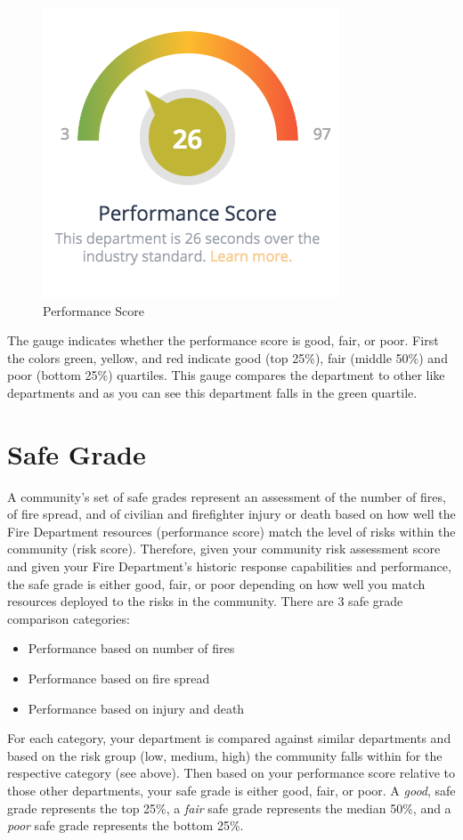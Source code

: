 \documentclass[12pt,oneside]{book}
\begin{document}
\begin{figure}[ht!]
\centering
\includegraphics[width=.5\columnwidth]{Figures/performance_score}
\caption{Performance Score}
\label{fig:perform}
\end{figure}

The gauge indicates whether the performance score is good, fair, or poor. First the colors green, yellow, and red indicate good (top 25\%), fair (middle 50\%) and poor (bottom 25\%) quartiles. This gauge compares the department to other like departments and as you can see this department falls in the green quartile. 

\FloatBarrier

\section{Safe Grade}

A community's set of safe grades represent an assessment of the number of fires, of fire spread, and of civilian and firefighter injury or death based on how well the Fire Department resources (performance score) match the level of risks within the community (risk score). Therefore, given your community risk assessment score and given your Fire Department's historic response capabilities and performance, the safe grade is either good, fair, or poor depending on how well you match resources deployed to the risks in the community. There are 3 safe grade comparison categories:

\begin{itemize}
\item Performance based on number of fires
\item Performance based on fire spread
\item Performance based on injury and death
\end{itemize}

For each category, your department is compared against similar departments and based on the risk group (low, medium, high) the community falls within for the respective category (see above). Then based on your performance score relative to those other departments, your safe grade is either good, fair, or poor. A {\it good}, safe grade represents the top 25\%, a {\it fair} safe grade represents the median 50\%, and a {\it poor} safe grade represents the bottom 25\%.
\end{document}
